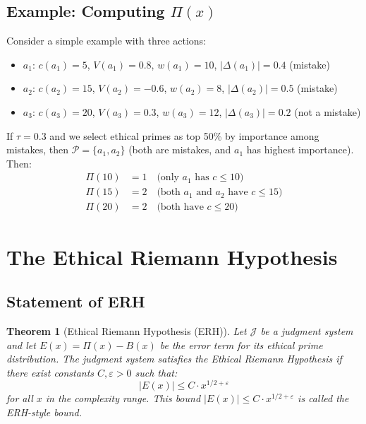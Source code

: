 \documentclass[12pt,a4paper]{article}
\newtheorem{theorem}{Theorem}[section]
\theoremstyle{definition}
\theoremstyle{remark}
\begin{document}
\subsection{Example: Computing $\Pi(x)$}

Consider a simple example with three actions:
\begin{itemize}
    \item $a_1$: $c(a_1) = 5$, $V(a_1) = 0.8$, $w(a_1) = 10$, $|\Delta(a_1)| = 0.4$ (mistake)
    \item $a_2$: $c(a_2) = 15$, $V(a_2) = -0.6$, $w(a_2) = 8$, $|\Delta(a_2)| = 0.5$ (mistake)
    \item $a_3$: $c(a_3) = 20$, $V(a_3) = 0.3$, $w(a_3) = 12$, $|\Delta(a_3)| = 0.2$ (not a mistake)
\end{itemize}

If $\tau = 0.3$ and we select ethical primes as top 50\% by importance among mistakes, then $\mathcal{P} = \{a_1, a_2\}$ (both are mistakes, and $a_1$ has highest importance). Then:
\begin{align*}
\Pi(10) &= 1 \quad \text{(only $a_1$ has $c \leq 10$)} \\
\Pi(15) &= 2 \quad \text{(both $a_1$ and $a_2$ have $c \leq 15$)} \\
\Pi(20) &= 2 \quad \text{(both have $c \leq 20$)}
\end{align*}

\section{The Ethical Riemann Hypothesis}
\label{sec:erh}

\subsection{Statement of ERH}

\begin{theorem}[Ethical Riemann Hypothesis (ERH)]
\label{thm:erh}
Let $\mathcal{J}$ be a judgment system and let $E(x) = \Pi(x) - B(x)$ be the error term for its ethical prime distribution. The judgment system satisfies the \emph{Ethical Riemann Hypothesis} if there exist constants $C, \varepsilon > 0$ such that:
\[
|E(x)| \leq C \cdot x^{1/2 + \varepsilon}
\]
for all $x$ in the complexity range. This bound $|E(x)| \leq C \cdot x^{1/2 + \varepsilon}$ is called the \emph{ERH-style bound}.
\end{theorem}
\end{document}
